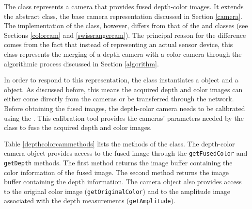 The \DepthColorCam{} class represents a camera that provides fused depth-color images. It extends the 
\Camera{} abstract class, the base camera representation discussed in Section \ref{camera}. The 
implementation of the \DepthColorCam{} class, however, differs from that of the \ColorCam{} and 
\SwissRangerCam{} classes (see Sections \ref{colorcam} and \ref{swissrangercam}). The principal reason for 
the difference comes from the fact that instead of representing an actual sensor device, this class represents 
the merging of a depth camera with a color camera through the algorithmic process discussed in Section 
\ref{algorithm}.

In order to respond to this representation, the \DepthColorCam{} class instantiates a \SwissRangerCam{} 
object and a \ColorCam{} object. As discussed before, this means the acquired depth and color images can
either come directly from the cameras or be transferred through the network. Before obtaining the fused 
images, the depth-color camera needs to be calibrated using the \DepthColorCalibrationTool{}. This 
calibration tool provides the cameras' parameters needed by the \DepthColorFusion{} class to fuse the 
acquired depth and color images.

Table \ref{depthcolorcammethods} lists the methods of the \DepthColorCam{} class. The depth-color camera
object provides access to the fused image through the \texttt{get\-Fused\-Col\-or} and \texttt{get\-Depth}
methods. The first method returns the image buffer containing the color information of the fused image. The
second method returns the image buffer containing the depth information. The camera object also provides
access to the original color image (\texttt{get\-O\-rig\-i\-nal\-Col\-or}) and to the amplitude image associated 
with the depth measurements (\texttt{get\-Am\-pli\-tude}).

